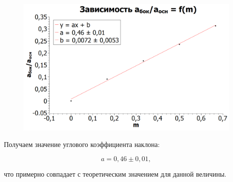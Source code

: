 \documentclass[a4paper, 12pt]{article}%
\begin{document}
\begin{enumerate}
\begin{figure}[h!]
\centering
\includegraphics[scale=0.8]{images/graph3.png}
\label{fig:Image1}
\end{figure}

Получаем значение углового коэффициента наклона:

\[a = 0,46 \pm 0,01,\]

что примерно совпадает с теоретическим значением для данной величины.

\end{enumerate}
\end{document}
